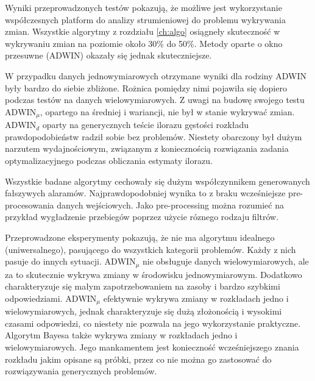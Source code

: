 Wyniki przeprowadzonych testów pokazują,
że możliwe jest wykorzystanie współczesnych platform do analizy strumieniowej
do problemu wykrywania zmian.
Wszystkie algorytmy z rozdziału \ref{ch:algo} osiągneły skuteczność w wykrywaniu zmian
na poziomie około 30\% do 50\%.
Metody oparte o okno przesuwne (ADWIN) okazały się jednak skuteczniejsze.

W przypadku danych jednowymiarowych otrzymane wyniki dla rodziny ADWIN były bardzo do siebie zbliżone.
Rożnica pomiędzy nimi pojawiła się dopiero podczas testów na danych wielowymiarowych.
Z uwagi na budowę swojego testu $\mbox{ADWIN}_\mu$, opartego na średniej i wariancji,
nie był w stanie wykrywać zmian.
$\mbox{ADWIN}_d$ oparty na generycznych teście ilorazu gęstości rozkładu prawdopodobieństw radził sobie bez problemów.
Niestety obarczony był dużym narzutem wydajnościowym,
związanym z koniecznością rozwiązania zadania optymalizacyjnego podczas obliczania estymaty ilorazu.

Wszystkie badane algorytmy cechowały się dużym współczynnikem generowanych fałszywych alaramów.
Najprawdopodobniej wynika to z braku wcześniejsze pre-procesowania danych wejściowych.
Jako pre-processing można rozumieć na przykład wygładzenie przebiegów poprzez użycie róznego rodzaju filtrów.

Przeprowadzone eksperymenty pokazują,
że nie ma algorytmu idealnego (uniwersalnego),
pasującego do wszystkich kategorii problemów.
Każdy z nich pasuje do innych sytuacji.
$\mbox{ADWIN}_\mu$ nie obsługuje danych wielowymiarowych,
ale za to skutecznie wykrywa zmiany w środowisku jednowymiarowym.
Dodatkowo charakteryzuje się małym zapotrzebowaniem na zasoby i bardzo szybkimi odpowiedziami.
$\mbox{ADWIN}_\mu$ efektywnie wykrywa zmiany w rozkładach jedno i wielowymiarowych,
jednak charakteryzuje się dużą złożonością i wysokimi czasami odpowiedzi,
co niestety nie pozwala na jego wykorzystanie praktyczne.
Algorytm Bayesa także wykrywa zmiany w rozkładach jedno i wielowymiarowych.
Jego mankamentem jest konieczność wcześniejszego znania rozkładu jakim opisane są próbki,
przez co nie można go zastosować do rozwiązywania generycznych problemów.
